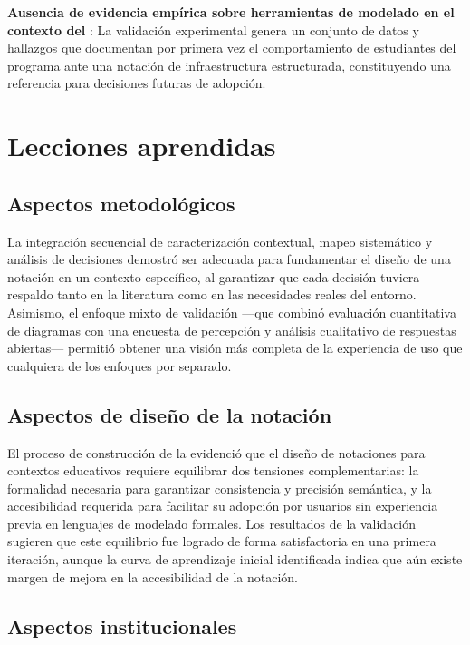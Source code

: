 \textbf{Ausencia de evidencia empírica sobre herramientas de modelado en el contexto del \GRID}: La validación experimental genera un conjunto de datos y hallazgos que documentan por primera vez el comportamiento de estudiantes del programa ante una notación de infraestructura estructurada, constituyendo una referencia para decisiones futuras de adopción.

\section{Lecciones aprendidas}
\noindent

\subsection{Aspectos metodológicos}
\noindent

La integración secuencial de caracterización contextual, mapeo sistemático y análisis de decisiones demostró ser adecuada para fundamentar el diseño de una notación en un contexto específico, al garantizar que cada decisión tuviera respaldo tanto en la literatura como en las necesidades reales del entorno. Asimismo, el enfoque mixto de validación ---que combinó evaluación cuantitativa de diagramas con una encuesta de percepción y análisis cualitativo de respuestas abiertas--- permitió obtener una visión más completa de la experiencia de uso que cualquiera de los enfoques por separado.

\subsection{Aspectos de diseño de la notación}
\noindent

El proceso de construcción de la \NDITI evidenció que el diseño de notaciones para contextos educativos requiere equilibrar dos tensiones complementarias: la formalidad necesaria para garantizar consistencia y precisión semántica, y la accesibilidad requerida para facilitar su adopción por usuarios sin experiencia previa en lenguajes de modelado formales. Los resultados de la validación sugieren que este equilibrio fue logrado de forma satisfactoria en una primera iteración, aunque la curva de aprendizaje inicial identificada indica que aún existe margen de mejora en la accesibilidad de la notación.

\subsection{Aspectos institucionales}
\noindent

